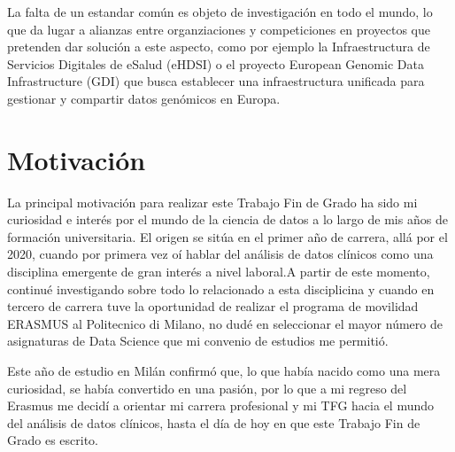 La falta de un estandar común es objeto de investigación en todo el mundo, lo que da lugar a alianzas entre organziaciones y competiciones en proyectos que pretenden dar solución a este aspecto, como por ejemplo la Infraestructura de Servicios Digitales de eSalud (eHDSI) \cite{DHE2023eHDSI} %
o el proyecto European Genomic Data Infrastructure (GDI) \cite{GDI2022GDI} que busca establecer una infraestructura unificada para gestionar y compartir datos genómicos en Europa.



\section{Motivación} \label{sec:01Motivacion}


La principal motivación para realizar este Trabajo Fin de Grado ha sido mi curiosidad e interés por el mundo de la ciencia de datos a lo largo de mis años de formación universitaria. El origen se sitúa en el primer año de carrera, allá por el 2020, cuando por primera vez oí hablar del análisis de datos clínicos como una disciplina emergente de gran interés a nivel laboral.A partir de este momento, continué investigando sobre todo lo relacionado a esta disciplicina y cuando en tercero de carrera tuve la oportunidad de realizar el programa de movilidad ERASMUS al Politecnico di Milano, no dudé en seleccionar el mayor número de asignaturas de Data Science que mi convenio de estudios me permitió. 

Este año de estudio en Milán confirmó que, lo que había nacido como una mera curiosidad, se había convertido en una pasión, por lo que a mi regreso del Erasmus me decidí a orientar mi carrera profesional y mi TFG hacia el mundo del análisis de datos clínicos, hasta el día de hoy en que este Trabajo Fin de Grado es escrito.

